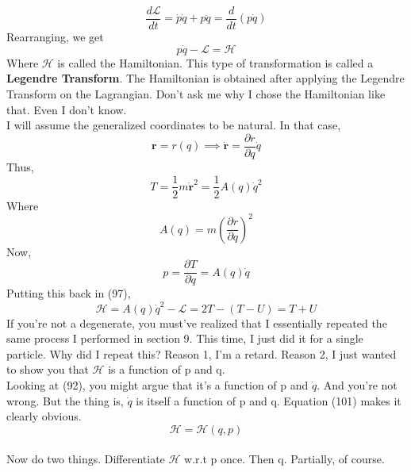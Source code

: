 \documentclass[12pt]{article}
\begin{document}
    \begin{equation}
        \frac{d\mathcal{L}}{dt} = \dot{p}\dot{q}+p\ddot{q}=\frac{d}{dt}\left(p\dot{q}\right)
    \end{equation}
    Rearranging, we get 
    \begin{equation}
        p\dot{q}-\mathcal{L}=\mathcal{H}
    \end{equation}
    Where $\mathcal{H}$ is called the Hamiltonian. This type of transformation is called a \textbf{Legendre Transform}.
    The Hamiltonian is obtained after applying the Legendre Transform on the Lagrangian. Don't ask me why I chose the Hamiltonian like that. Even I don't know.
    \\ I will assume the generalized coordinates to be natural. In that case,
    \begin{equation}
        \mathbf{r}=r(q) \implies \dot{\mathbf{r}}=\frac{\partial r}{\partial q}\dot{q}
    \end{equation}
    Thus,
    \begin{equation}
        T = \frac{1}{2}m\mathbf{\dot{r}}^2 = \frac{1}{2}A(q)\dot{q}^2
    \end{equation}
    Where
    \begin{equation}
        A(q) = m\left(\frac{\partial r}{\partial q}\right)^2
    \end{equation}
    Now, 
    \begin{equation}
        p=\frac{\partial T}{\partial \dot{q}}=A(q)\dot{q}
    \end{equation}
    Putting this back in (97),
    \begin{equation}
        \mathcal{H}=A(q)\dot{q}^2-\mathcal{L}=2T-(T-U)=T+U
    \end{equation}
    If you're not a degenerate, you must've realized that I essentially repeated the same process I performed in section 9. This time, I just did it for a single particle.
    Why did I repeat this? Reason 1, I'm a retard. Reason 2, I just wanted to show you that $\mathcal{H}$ is a function of p and q.
    \\ Looking at (92), you might argue that it's a function of p and $\dot{q}$. And you're not wrong. But the thing is, $\dot{q}$ is itself a function of p and q. Equation (101) makes it clearly obvious. 
    \begin{equation}
        \mathcal{H}=\mathcal{H}(q,p)
    \end{equation}
    \\ Now do two things. Differentiate $\mathcal{H}$ w.r.t p once. Then q. Partially, of course.
\end{document}
